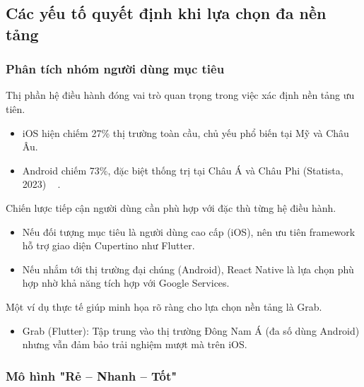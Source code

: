 \subsection{Các yếu tố quyết định khi lựa chọn đa nền tảng}
\renewcommand{\labelitemi}{--}    


  \subsubsection{Phân tích nhóm người dùng mục tiêu}
    
      Thị phần hệ điều hành đóng vai trò quan trọng trong việc xác định nền tảng ưu tiên.
      \setlength{\leftmargini}{1.5cm}
      \begin{itemize}
        \item iOS hiện chiếm 27\% thị trường toàn cầu, chủ yếu phổ biến tại Mỹ và Châu Âu.
        \item Android chiếm 73\%, đặc biệt thống trị tại Châu Á và Châu Phi (Statista, 2023) ~\cite{biornhansen2021} .
      \end{itemize}
    \vspace{0.5em}

    
      Chiến lược tiếp cận người dùng cần phù hợp với đặc thù từng hệ điều hành.
      \setlength{\leftmargini}{1.5cm}
      \begin{itemize}
          \item Nếu đối tượng mục tiêu là người dùng cao cấp (iOS), nên ưu tiên framework hỗ trợ giao diện Cupertino như Flutter.
          \item Nếu nhắm tới thị trường đại chúng (Android), React Native là lựa chọn phù hợp nhờ khả năng tích hợp với Google Services.
      \end{itemize}
    \vspace{0.5em}

    
      Một ví dụ thực tế giúp minh họa rõ ràng cho lựa chọn nền tảng là Grab.
      \setlength{\leftmargini}{1.5cm}
      \begin{itemize}
          \item Grab (Flutter): Tập trung vào thị trường Đông Nam Á (đa số dùng Android) nhưng vẫn đảm bảo trải nghiệm mượt mà trên iOS.
      \end{itemize}

    \subsubsection{Mô hình "Rẻ – Nhanh – Tốt"}
    
